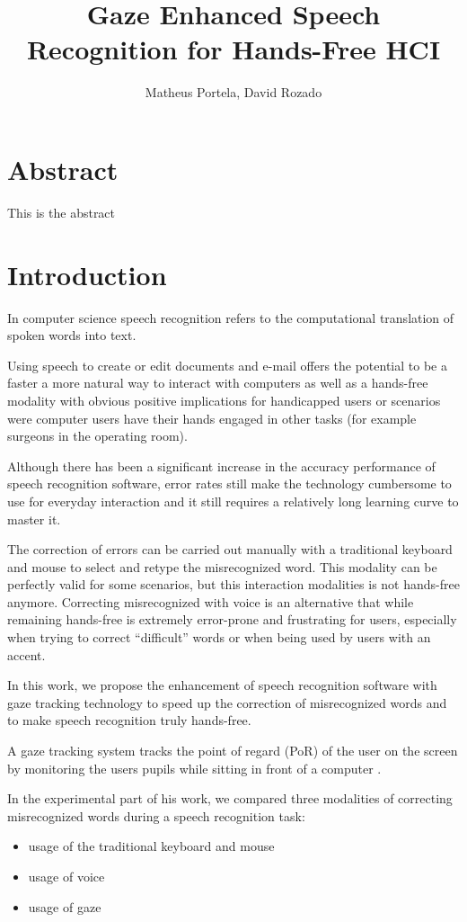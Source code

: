 \documentclass[]{article}
\title{Gaze Enhanced Speech Recognition for Hands-Free HCI}
\author{Matheus Portela, David Rozado}
\begin{document}
\maketitle

\section{Abstract}
This is the abstract

\section{Introduction}
In computer science speech recognition refers to the computational translation of spoken words into text.

Using speech to create or edit documents and e-mail offers the potential to be a faster a more natural way to interact
with computers as well as a hands-free modality with obvious positive implications for handicapped users or
scenarios were computer users have their hands engaged in other tasks (for example surgeons in the operating room).

Although there has been a significant increase in the accuracy performance of speech recognition software, error
rates still make the technology cumbersome to use for everyday interaction  and it still requires a relatively long
learning curve to master it.

The correction of errors can be carried out manually with a traditional keyboard and mouse to select and retype the
misrecognized word. This modality can be perfectly valid for some scenarios, but this interaction modalities is not
hands-free anymore.  Correcting misrecognized with voice is an alternative that while remaining hands-free is extremely
error-prone and frustrating for users, especially when trying to correct ``difficult'' words or when being used by users
with an accent.

In this work, we propose the enhancement of speech recognition software with gaze tracking technology to speed up the
correction of misrecognized words and to make speech recognition truly hands-free.

A gaze tracking system tracks the point of regard (PoR) of the user on the screen by monitoring the users pupils while
sitting in front of a computer \cite{Rozado2012a}.

In the experimental part of his work, we compared three modalities of correcting misrecognized words during  a speech
recognition task:
\begin{itemize}
  \item usage of the traditional keyboard and mouse
  \item usage of voice
  \item usage of gaze
\end{itemize}
\end{document}
